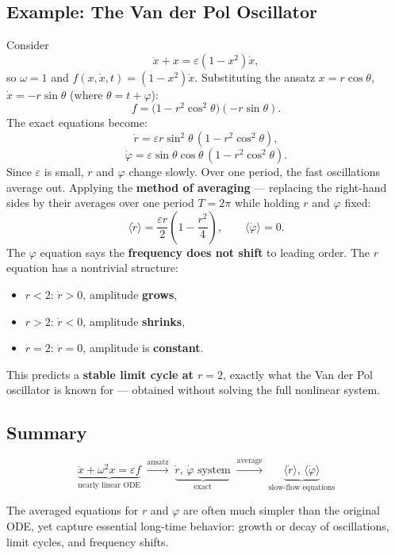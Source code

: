 \documentclass{article}
\begin{document}
\subsection{Example: The Van der Pol Oscillator}

Consider
\[
    \ddot{x} + x = \varepsilon(1 - x^2)\dot{x},
\]
so $\omega = 1$ and $f(x,\dot{x},t) = (1 - x^2)\dot{x}$. Substituting the ansatz
$x = r\cos\theta$, $\dot{x} = -r\sin\theta$ (where $\theta = t + \varphi$):
\[
    f = \bigl(1 - r^2\cos^2\theta\bigr)(-r\sin\theta).
\]
The exact equations become:
\[
    \dot{r} = \varepsilon r\sin^2\theta\,(1 - r^2\cos^2\theta),
\]
\[
    \dot{\varphi} = \varepsilon\sin\theta\cos\theta\,(1 - r^2\cos^2\theta).
\]
Since $\varepsilon$ is small, $r$ and $\varphi$ change slowly. Over one period, the fast
oscillations average out. Applying the \textbf{method of averaging} --- replacing the right-hand
sides by their averages over one period $T = 2\pi$ while holding $r$ and $\varphi$ fixed:
\[
    \langle \dot{r} \rangle = \frac{\varepsilon r}{2}\!\left(1 - \frac{r^2}{4}\right),
    \qquad
    \langle \dot{\varphi} \rangle = 0.
\]
The $\varphi$ equation says the \textbf{frequency does not shift} to leading order. The $r$
equation has a nontrivial structure:
\begin{itemize}
    \item $r < 2$: $\dot{r} > 0$, amplitude \textbf{grows},
    \item $r > 2$: $\dot{r} < 0$, amplitude \textbf{shrinks},
    \item $r = 2$: $\dot{r} = 0$, amplitude is \textbf{constant}.
\end{itemize}
This predicts a \textbf{stable limit cycle at $r = 2$}, exactly what the Van der Pol oscillator is
known for --- obtained without solving the full nonlinear system.

\subsection{Summary}

\[
    \underbrace{\ddot{x}+\omega^2 x = \varepsilon f}_{\text{nearly linear ODE}}
    \;\xrightarrow{\text{ansatz}}\;
    \underbrace{\dot{r},\,\dot{\varphi}\text{ system}}_{\text{exact}}
    \;\xrightarrow{\text{average}}\;
    \underbrace{\langle\dot{r}\rangle,\,\langle\dot{\varphi}\rangle}_{\text{slow-flow equations}}
\]

The averaged equations for $r$ and $\varphi$ are often much simpler than the original ODE, yet
capture essential long-time behavior: growth or decay of oscillations, limit cycles, and frequency
shifts.
\end{document}
